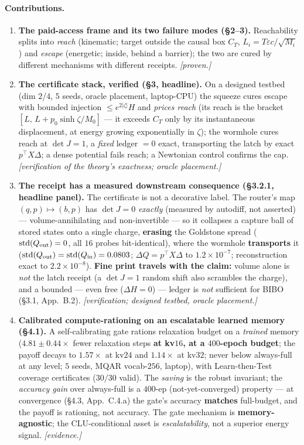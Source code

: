 \documentclass[11pt]{article}
\newcommand{\detJ}{\det J}
\begin{document}
\paragraph{Contributions.}
\begin{enumerate}\itemsep2pt
\item \textbf{The paid-access frame and its two failure modes (\S2--3).} Reachability splits into \emph{reach} (kinematic; target outside the causal box $C_T$, $L_i=T\varepsilon c/\sqrt{M_i}$) and \emph{escape} (energetic; inside, behind a barrier); the two are cured by different mechanisms with different receipts. \emph{[proven.]}
\item \textbf{The certificate stack, verified (\S3, headline).} On a designed testbed (dim $2$/$4$, $5$ seeds, oracle placement, laptop-CPU) the squeeze cures escape with bounded injection $\le e^{2|\zeta|}H$ and \emph{prices reach} (its reach is the bracket $[L,\,L+p_0\sinh\zeta/M_0]$ --- it exceeds $C_T$ only by its instantaneous displacement, at energy growing exponentially in $\zeta$); the wormhole cures reach at $\detJ=1$, a \emph{fixed} ledger $=0$ exact, transporting the latch by exact $p^\top X\Delta$; a dense potential fails reach; a Newtonian control confirms the cap. \emph{[verification of the theory's exactness; oracle placement.]}
\item \textbf{The receipt has a measured downstream consequence (\S3.2.1, headline panel).} The certificate is not a decorative label. The router's map $(q,p)\mapsto(b,p)$ has $\detJ=0$ \emph{exactly} (measured by autodiff, not asserted) --- volume-annihilating and non-invertible --- so it collapses a capture ball of stored states onto a single charge, \textbf{erasing} the Goldstone spread ($\mathrm{std}(Q_{\rm out})=0$, all $16$ probes bit-identical), where the wormhole \textbf{transports} it ($\mathrm{std}(Q_{\rm out})=\mathrm{std}(Q_{\rm in})=0.0803$; $\Delta Q=p^\top X\Delta$ to $1.2{\times}10^{-7}$; reconstruction exact to $2.2{\times}10^{-8}$). \textbf{Fine print travels with the claim:} volume alone is \emph{not} the latch receipt (a $\detJ=1$ random shift also scrambles the charge), and a bounded --- even free ($\Delta H=0$) --- ledger is \emph{not} sufficient for BIBO (\S3.1, App.~B.2). \emph{[verification; designed testbed, oracle placement.]}
\item \textbf{Calibrated compute-rationing on an escalatable learned memory (\S4.1).} A self-calibrating gate rations relaxation budget on a \emph{trained} memory ($4.81\pm0.44\times$ fewer relaxation steps \textbf{at kv$16$, at a $400$-epoch budget}; the payoff decays to $1.57\times$ at kv$24$ and $1.14\times$ at kv$32$; never below always-full at any level; $5$ seeds, MQAR vocab-$256$, laptop), with Learn-then-Test coverage certificates ($30/30$ valid). The \emph{saving} is the robust invariant; the \emph{accuracy gain} over always-full is a $400$-ep (not-yet-converged) property --- at convergence (\S4.3, App.~C.4.a) the gate's accuracy \textbf{matches} full-budget, and the payoff is rationing, not accuracy. The gate mechanism is \textbf{memory-agnostic}; the CLU-conditional asset is \emph{escalatability}, not a superior energy signal. \emph{[evidence.]}

\end{enumerate}
\end{document}
